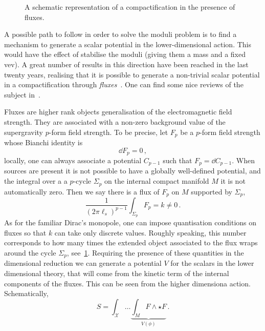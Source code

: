 \documentclass[draft]{phd}
\begin{document}
					\begin{figure}[h!]
						\centering
						
						\caption{A schematic representation of a compactification in the presence of fluxes.}
						\label{fluxcomp}
					\end{figure}
			A possible path to follow in order to solve the moduli problem is to find a mechanism to generate a scalar potential in the lower-dimensional action.
			This would have the effect of stabilise the moduli (giving them a mass and a fixed vev).
			A great number of results in this direction have been reached in the last twenty years, realising that it is possible to generate a non-trivial scalar potential in a compactification through \emph{fluxes}~\cite{fluxcomp1, fluxcomp2, fluxcomp3}.
			One can find some nice reviews of the subject in~\cite{DuffReviewComp, MarianaFluxReview, LustReviewComp, henlect}.
			
			Fluxes are higher rank objects generalisation of the electromagnetic field strength.
			They are associated with a non-zero background value of the supergravity $p$-form field strength.
			To be precise, let $F_p$ be a $p$-form field strength whose Bianchi identity is
					\begin{equation*}
						\dd F_p = 0\, ,
					\end{equation*}
			locally, one can always associate a potential $C_{p-1}$ such that $F_p = \dd C_{p-1}$. 
			When sources are present it is not possible to have a globally well-defined potential, and the integral over a a $p$-cycle $\Sigma_p$ on the internal compact manifold $M$ it is not automatically zero. 
			Then we say there is a flux of $F_p$ on $M$ supported by $\Sigma_p$,
					\begin{equation*}
						\frac{1}{(2\pi \ell_s)^{p-1}}\int_{\Sigma_p}\!\! F_p = k \neq 0\, .
					\end{equation*}
			As for the familiar Dirac's monopole, one can impose quantisation conditions on fluxes so that $k$ can take only discrete values.
			Roughly speaking, this number corresponds to how many times the extended object associated to the flux wraps around the cycle $\Sigma_p$, see~\cref{fluxcomp}.
			Requiring the presence of these quantities in the dimensional reduction we can generate a potential $V$ for the scalars in the lower dimensional theory, that will come from the kinetic term of the internal components of  the fluxes.
			This can be seen from the higher dimensiona action. 
			Schematically,
					\begin{equation*}
						S= \int_{\mathcal{X}} \ldots \underbrace{\int_{M} F \wedge \star F}_{V(\phi)} \, .
					\end{equation*}
			
\end{document}
